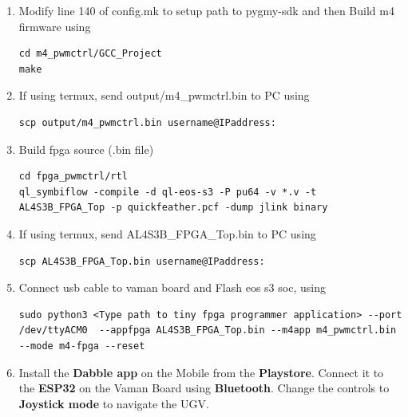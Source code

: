 \begin{enumerate}[label=\thesection.\arabic*.,ref=\thesection.\theenumi]
\item  Modify line 140 of config.mk to setup path to pygmy-sdk and then Build m4 firmware using
\begin{lstlisting}
cd m4_pwmctrl/GCC_Project
make
\end{lstlisting}

\item If using termux, send output/m4{\_}pwmctrl.bin to PC using
\begin{lstlisting}
scp output/m4_pwmctrl.bin username@IPaddress:
\end{lstlisting} 

\item Build fpga source (.bin file)
\begin{lstlisting}
cd fpga_pwmctrl/rtl
ql_symbiflow -compile -d ql-eos-s3 -P pu64 -v *.v -t AL4S3B_FPGA_Top -p quickfeather.pcf -dump jlink binary 
\end{lstlisting} 

\item If using termux, send AL4S3B{\_}FPGA{\_}Top.bin to PC using
\begin{lstlisting}
scp AL4S3B_FPGA_Top.bin username@IPaddress:
\end{lstlisting} 

\item Connect usb cable to vaman board and Flash eos s3 soc, using
\begin{lstlisting}
sudo python3 <Type path to tiny fpga programmer application> --port /dev/ttyACM0  --appfpga AL4S3B_FPGA_Top.bin --m4app m4_pwmctrl.bin --mode m4-fpga --reset
\end{lstlisting} 

\item Install the \textbf{Dabble app} on the Mobile from the \textbf{Playstore}. Connect it to the \textbf{ESP32} on the Vaman Board using \textbf{Bluetooth}. Change the controls to \textbf{Joystick mode} to navigate the UGV.\\


\end{enumerate}